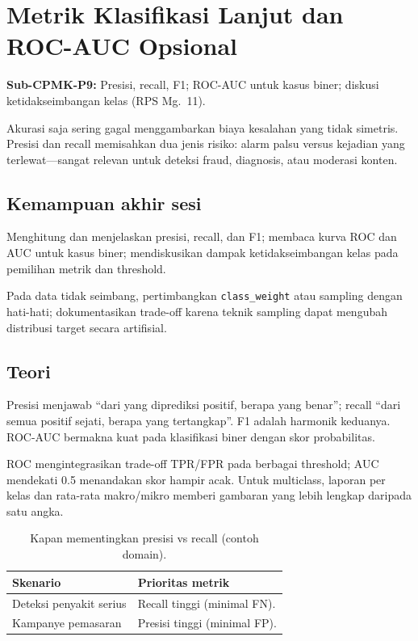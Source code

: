 \documentclass[../main.tex]{subfiles}
\begin{document}
\chapter{Metrik Klasifikasi Lanjut dan ROC-AUC Opsional}

\begin{subcpmk}
  \item \textbf{Sub-CPMK-P9:} Presisi, recall, F1; ROC-AUC untuk kasus biner; diskusi ketidakseimbangan kelas (RPS Mg.\ 11).
\end{subcpmk}


\noindent Akurasi saja sering gagal menggambarkan biaya kesalahan yang tidak simetris. Presisi dan recall memisahkan dua jenis risiko: alarm palsu versus kejadian yang terlewat---sangat relevan untuk deteksi fraud, diagnosis, atau moderasi konten.

\section{Kemampuan akhir sesi}

Menghitung dan menjelaskan presisi, recall, dan F1; membaca kurva ROC dan AUC untuk kasus biner; mendiskusikan dampak ketidakseimbangan kelas pada pemilihan metrik dan threshold.

Pada data tidak seimbang, pertimbangkan \texttt{class\_weight} atau sampling dengan hati-hati; dokumentasikan trade-off karena teknik sampling dapat mengubah distribusi target secara artifisial.

\section{Teori}

\begin{konsep}
Presisi menjawab ``dari yang diprediksi positif, berapa yang benar''; recall ``dari semua positif sejati, berapa yang tertangkap''. F1 adalah harmonik keduanya. ROC-AUC bermakna kuat pada klasifikasi biner dengan skor probabilitas.
\end{konsep}

ROC mengintegrasikan trade-off TPR/FPR pada berbagai threshold; AUC mendekati 0.5 menandakan skor hampir acak. Untuk multiclass, laporan per kelas dan rata-rata makro/mikro memberi gambaran yang lebih lengkap daripada satu angka.



\begin{table}[htbp]
\centering
\caption{Kapan mementingkan presisi vs recall (contoh domain).}
\label{tab:precision-recall-domain}
\begin{tabular}{@{}>{\raggedright\arraybackslash}p{3.6cm}>{\raggedright\arraybackslash}p{9.1cm}@{}}
\toprule
\textbf{Skenario} & \textbf{Prioritas metrik} \\
\midrule
Deteksi penyakit serius & Recall tinggi (minimal FN). \\
Kampanye pemasaran & Presisi tinggi (minimal FP). \\
\bottomrule
\end{tabular}
\end{table}
\end{document}
